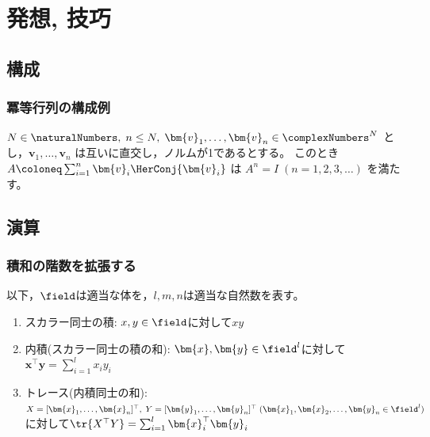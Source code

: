 \chapter{発想, 技巧}
    \section{構成}
        \subsection{冪等行列の構成例}
            $N\in\naturalNumbers,\;n\leq N,\;\bm{v}_1,\dots,\bm{v}_n\in\complexNumbers^N$ とし，$\bm{v}_1,\dots,\bm{v}_n$ は互いに直交し，ノルムが1であるとする。
            このとき $A \coloneq \sum_{i=1}^n \bm{v}_i\HerConj{\bm{v}_i}$ は $A^n = I\;(n=1,2,3,\dots)$ を満たす。
    \section{演算}
        \subsection{積和の階数を拡張する}
            以下，$\field$は適当な体を，$l,m,n$は適当な自然数を表す。
            \begin{enumerate}
                \item スカラー同士の積: $x,y\in\field$に対して$xy$
                \item 内積(スカラー同士の積の和): $\bm{x},\bm{y} \in \field^l$に対して$\bm{x}^\top\bm{y} = \sum_{i=1}^l x_i y_i$
                \item トレース(内積同士の和): $X = [\bm{x}_1,\dotsc,\bm{x}_n]^\top,\;Y = [\bm{y}_1,\dotsc,\bm{y}_n]^\top\;(\bm{x}_1,\bm{x}_2,\dotsc,\bm{y}_n \in \field^l)$に対して$\tr{X^\top Y} = \sum_{i=1}^l \bm{x}_i^\top\bm{y}_i$
            \end{enumerate}